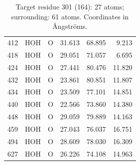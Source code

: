 \begin{table}[htbp]
{\begin{tabular}{@{}llcrrr@{}}
412  & HOH  & O     &  31.613 &  68.895 &   9.213 \\
418  & HOH  & O     &  29.051 &  71.057 &   6.695 \\
424  & HOH  & O     &  27.441 &  80.476 &  11.820 \\
432  & HOH  & O     &  23.861 &  80.851 &  11.807 \\
434  & HOH  & O     &  23.509 &  77.101 &  14.851 \\
440  & HOH  & O     &  22.566 &  73.860 &  14.380 \\
448  & HOH  & O     &  29.059 &  79.889 &  14.163 \\
459  & HOH  & O     &  27.043 &  76.037 &  16.751 \\
494  & HOH  & O     &  28.609 &  78.030 &  16.309 \\
627  & HOH  & O     &  26.226 &  74.108 &  14.963 \\
\bottomrule
\end{tabular}%
}
\caption{Target residue 301 (164): 27 atoms; surrounding: 61 atoms. Coordinates in \AA ngstr\"oms.}
\label{tab:atoms_301_164}
\end{table}
